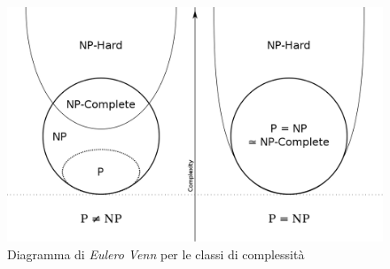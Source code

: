 \begin{figure}[H]
	\centering
	\includegraphics[scale = 0.3]{img/problem.png}
	\caption{Diagramma di \emph{Eulero Venn} per le classi di complessità}
	\label{fig:complexity}
\end{figure}
